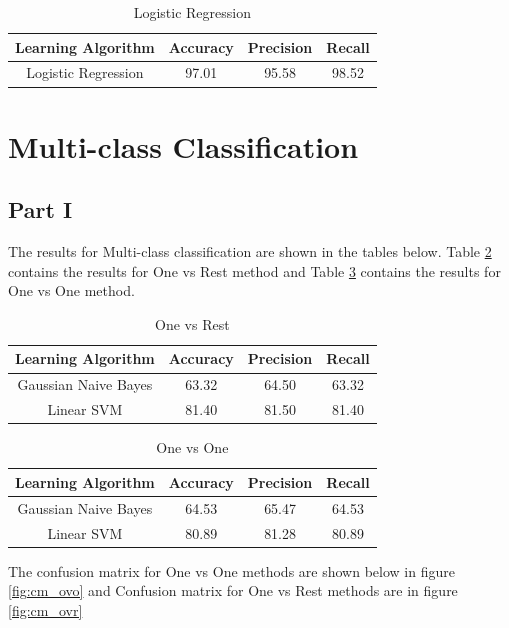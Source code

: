 \documentclass[11pt]{article}
\begin{document}
\begin{table}[h]
	\centering
	\begin{tabular}{|c|c|c|c|} \hline
		Learning Algorithm & Accuracy & Precision & Recall\\ \hline
		Logistic Regression& 97.01 & 95.58 & 98.52 \\
		\hline
	\end{tabular}
	\caption{Logistic Regression}
	\label{table:ovr_res}
\end{table}




\section{Multi-class Classification}
\subsection{Part I}

The results for Multi-class classification are shown in the tables below. Table \ref{table:ovr_res} contains the results for One vs Rest method and Table \ref{table:ovo_res} contains the results for One vs One method.

\begin{table}[h]
	\centering
	\begin{tabular}{|c|c|c|c|} \hline
		Learning Algorithm & Accuracy & Precision & Recall\\ \hline
		Gaussian Naive Bayes & 63.32 & 64.50 & 63.32 \\
		Linear SVM & 81.40 & 81.50 & 81.40 \\
		\hline
		\end{tabular}
		\caption{One vs Rest}
		\label{table:ovr_res}
\end{table}

\begin{table}[h]
	\centering
	\begin{tabular}{|c|c|c|c|} \hline
		Learning Algorithm & Accuracy & Precision & Recall\\ \hline
		Gaussian Naive Bayes & 64.53 & 65.47 & 64.53 \\
		Linear SVM & 80.89 & 81.28 & 80.89 \\
		\hline
	\end{tabular}
	\caption{One vs One}
	\label{table:ovo_res}
\end{table}

\newpage
The confusion matrix for One vs One methods are shown below in figure \ref{fig:cm_ovo} and Confusion matrix for One vs Rest methods are in figure \ref{fig:cm_ovr}
\end{document}
